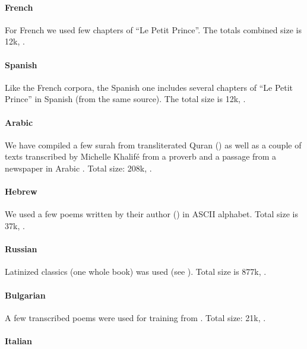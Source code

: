 \paragraph*{French}

For French we used few chapters of ``Le Petit Prince''.
The totals combined size is 12k, .

\paragraph*{Spanish}

Like the French corpora, the Spanish one includes several
chapters of ``Le Petit Prince'' in Spanish (from the same source).
The total size is 12k, .

\paragraph*{Arabic}

We have compiled a few surah from transliterated Quran (\cite{quran})
as well as a couple of texts transcribed by Michelle Khalif\'e
from a proverb \cite{jeha} and a passage from a newspaper in Arabic \cite{arnews}.
Total size: 208k, .

\paragraph*{Hebrew}

We used a few poems written by their author (\cite{hepoems}) in ASCII alphabet.
Total size is 37k, .

\paragraph*{Russian}

Latinized classics (one whole book) was used (see \cite{ohotnik}).
Total size is 877k, .

\paragraph*{Bulgarian}

A few transcribed poems were used for training from \cite{bgpoems}.
Total size: 21k, .

\paragraph*{Italian}

